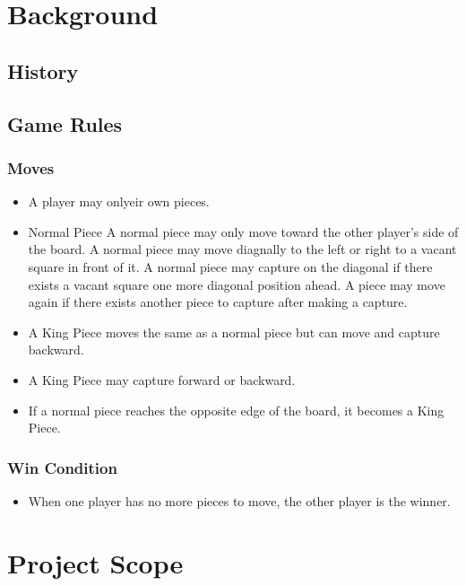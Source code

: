 \documentclass{scrreprt}
\begin{document}
\section{Background}

\subsection{History}


\subsection{Game Rules}

\subsubsection{Moves}
\begin{itemize}
    \item A player may onlyeir own pieces.
    \item Normal Piece
        \subitem A normal piece may only move toward the other player's side of the board.
        \subitem A normal piece may move diagnally to the left or right to a vacant square in front of it.
        \subitem A normal piece may capture on the diagonal if there exists a vacant square one more diagonal position ahead.
            \subsubitem A piece may move again if there exists another piece to capture after making a capture.
    \item A King Piece moves the same as a normal piece but can move and capture backward.
    \item A King Piece may capture forward or backward.
    \item If a normal piece reaches the opposite edge of the board, it becomes a King Piece.
\end{itemize}

\subsubsection{Win Condition}
\begin{itemize}
    \item When one player has no more pieces to move, the other player is the winner.
\end{itemize}

\section{Project Scope}
\end{document}
